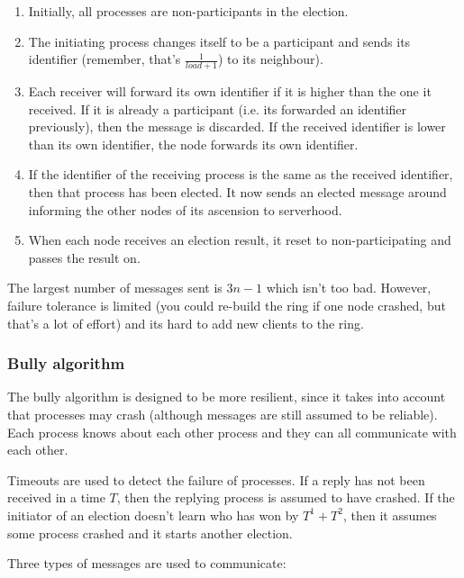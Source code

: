 \begin{enumerate}
  \item Initially, all processes are non-participants in the election.

  \item The initiating process changes itself to be a participant and sends its
  identifier (remember, that's $\frac{1}{load + 1}$) to its neighbour).

  \item Each receiver will forward its own identifier if it is higher than the
  one it received. If it is already a participant (i.e. its forwarded an
  identifier previously), then the message is discarded. If the received
  identifier is lower than its own identifier, the node forwards its own 
  identifier.

  \item If the identifier of the receiving process is the same as the received 
  identifier, then that process has been elected. It now sends an elected
  message around informing the other nodes of its ascension to serverhood.

  \item When each node receives an election result, it reset to
  non-participating and passes the result on.
\end{enumerate}

The largest number of messages sent is $3n -1$ which isn't too bad. However,
failure tolerance is limited (you could re-build the ring if one node crashed,
but that's a lot of effort) and its hard to add new clients to the ring.

\subsubsection{Bully algorithm}

The bully algorithm is designed to be more resilient, since it takes into
account that processes may crash (although messages are still assumed to be
reliable). Each process knows about each other process and they can all
communicate with each other.

Timeouts are used to detect the failure of processes. If a reply has not been
received in a time $T$, then the replying process is assumed to have crashed. If
the initiator of an election doesn't learn who has won by $T^1 + T^2$, then it
assumes some process crashed and it starts another election.

Three types of messages are used to communicate:

